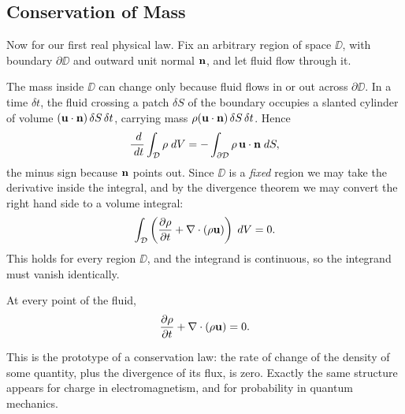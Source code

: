 \documentclass[a4paper]{scrartcl}
\newcommand{\pd}[2]{\frac{\partial #1}{\partial #2}}
\begin{document}
\subsection{Conservation of Mass}

Now for our first real physical law. Fix an arbitrary region of space $\DD$, with boundary $\partial \DD$ and outward unit normal $\mathbf{n}$, and let fluid flow through it.

\begin{center}
\end{center}

The mass inside $\DD$ can change only because fluid flows in or out across $\partial\DD$. In a time $\delta t$, the fluid crossing a patch $\delta S$ of the boundary occupies a slanted cylinder of volume $(\mathbf{u} \cdot \mathbf{n})\, \delta S \, \delta t$, carrying mass $\rho (\mathbf{u} \cdot \mathbf{n}) \, \delta S \, \delta t$. Hence
$$
\frac{\; d}{\; d t} \int_{\mathcal{D}} \rho \; d V = - \int_{\partial \mathcal{D}} \rho \, \mathbf{u} \cdot \mathbf{n} \; d S,
$$
the minus sign because $\mathbf{n}$ points out. Since $\DD$ is a \emph{fixed} region we may take the derivative inside the integral, and by the divergence theorem we may convert the right hand side to a volume integral:
$$
\int_\DD \left( \pd{\rho}{t} + \nabla \cdot (\rho \vv u)\right) \dd V = 0.
$$
This holds for every region $\DD$, and the integrand is continuous, so the integrand must vanish identically.

\begin{proposition}
	At every point of the fluid,
	$$
	\pd{\rho}{t} + \nabla \cdot(\rho \vv u) = 0.
	$$
\end{proposition}

This is the prototype of a conservation law: the rate of change of the density of some quantity, plus the divergence of its flux, is zero. Exactly the same structure appears for charge in electromagnetism, and for probability in quantum mechanics.
\end{document}
